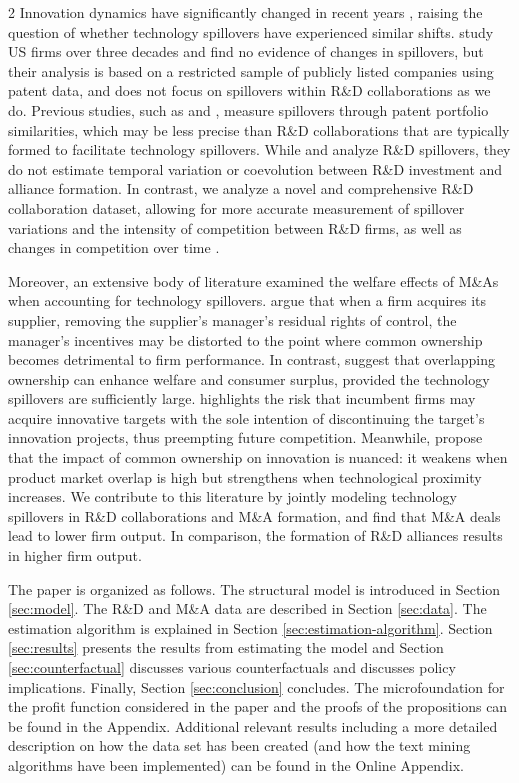 \documentclass[12pt]{article}
\begin{document}
\begin{spacing}{2}
Innovation dynamics have significantly changed in recent years \citep{bloom2020ideas}, raising the question of whether technology spillovers have experienced similar shifts. \citet{Lucking2019} study US firms over three decades and find no evidence of changes in spillovers, but their analysis is based on a restricted sample of publicly listed companies using patent data, and does not focus on spillovers within R\&D collaborations as we do. Previous studies, such as \citet{Bloom2013} and \citet{Lucking2019}, measure spillovers through patent portfolio similarities, which may be less precise than R\&D collaborations that are typically formed to facilitate technology spillovers. While \citet{Konig2018} and \citet{Hsieh2019,Hsieh2021} analyze R\&D spillovers, they do not estimate temporal variation or coevolution between R\&D investment and alliance formation. In contrast, we analyze a novel and comprehensive R\&D collaboration dataset, allowing for more accurate measurement of spillover variations and the intensity of competition between R\&D firms, as well as changes in competition over time \citep{hoberg2016,hoberg2022scope}.

Moreover, an extensive body of literature examined the welfare effects of M\&As when accounting for technology spillovers. \citet{grossman1986costs} argue that when a firm acquires its supplier, removing the supplier's manager's residual rights of control, the manager's incentives may be distorted to the point where common ownership becomes detrimental to firm performance. In contrast, \citet{lopez2019overlapping} suggest that overlapping ownership can enhance welfare and consumer surplus, provided the technology spillovers are sufficiently large. \citet{cunningham2021killer} highlights the risk that incumbent firms may acquire innovative targets with the sole intention of discontinuing the target’s innovation projects, thus preempting future competition. Meanwhile, \citet{anton2024innovation} propose that the impact of common ownership on innovation is nuanced: it weakens when product market overlap is high but strengthens when technological proximity increases. We contribute to this literature by jointly modeling technology spillovers in R\&D collaborations and M\&A formation, and find that M\&A deals lead to lower firm output. In comparison, the formation of R\&D alliances results in higher firm output.

The paper is organized as follows. The structural model is introduced in Section \ref{sec:model}. The R\&D and M\&A data are described in Section \ref{sec:data}. The estimation algorithm is explained in Section \ref{sec:estimation-algorithm}. Section \ref{sec:results} presents the results from estimating the model and Section \ref{sec:counterfactual} discusses various counterfactuals and discusses policy implications. Finally, Section \ref{sec:conclusion} concludes. The microfoundation for the profit function considered in the paper and the proofs of the propositions can be found in the Appendix. Additional relevant results including a more detailed description on how the data set has been created (and how the text mining algorithms have been implemented) can be found in the Online Appendix.


\end{spacing}
\end{document}
